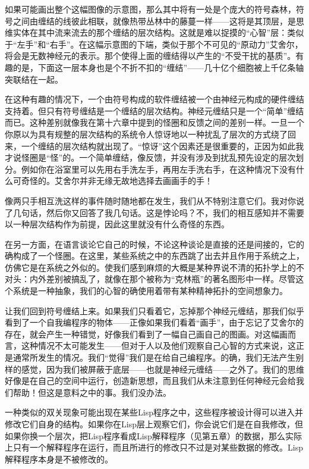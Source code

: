 如果可能画出整个这幅图像的示意图，那么其中将有一处是个庞大的符号森林，符号之间由缠结的线彼此相联，就像热带丛林中的藤蔓一样——这将是其顶层，是思维实体在其中流来流去的那个缠结的层次结构。这就是难以捉摸的“心智”层：类似于“左手”和“右手”。在这幅示意图的下端，类似于那个不可见的“原动力”艾舍尔，将会是无数神经元的表示。那个使得上面的缠结得以产生的“不受干扰的基质”。有趣的是，下面这一层本身也是个不折不扣的“缠结”——几十亿个细胞被上千亿条轴突联结在一起。

在这种有趣的情况下，一个由符号构成的软件缠结被一个由神经元构成的硬件缠结支持着。但只有符号缠结是一个缠结的层次结构。神经元缠结只是一个“简单”缠结而已。这种差别就像我在第十六章中提到的怪圈和反馈之间的差别一样。一旦一个你原以为具有规整的层次结构的系统令人惊讶地以一种扰乱了层次的方式绕了回来，一个缠结的层次结构就出现了。“惊讶”这个因素还是很重要的，正因为如此我才说怪圈是“怪”的。一个简单缠结，像反馈，并没有涉及到扰乱预先设定的层次划分。例如你在浴室里可以先用右手洗左手，再用左手洗右手，在这种情况下没有什么可奇怪的。艾舍尔并非无缘无故地选择去画画手的手！

像两只手相互洗这样的事件随时随地都在发生，我们从不特别注意它们。我对你说了几句话，然后你又回答了我几句话。这是悖论吗？不，我们的相互感知并不需要以一种层次结构作为前提，因此这里就没有什么奇怪的东西。

在另一方面，在语言谈论它自己的时候，不论这种谈论是直接的还是间接的，它的确构成了一个怪圈。在这里，某些系统之中的东西跳了出去并且作用于系统之上，仿佛它是在系统之外似的。使我们感到麻烦的大概是某种界说不清的拓扑学上的不对头：内外差别被搞乱了，就像在那个被称为“克林瓶”的著名图形中一样。尽管这个系统是一种抽象，我们的心智的确使用着带有某种精神拓扑的空间想象力。

让我们回到符号缠结上来。如果我们只看着它，忘掉那个神经元缠结，那我们似乎看到了一个自我编程序的物体——正像如果我们看着“画手”，由于忘记了艾舍尔的存在，就会产生一种错觉，好像我们看到了一幅自己画自己的图画。对这幅画而言，这种情况不太可能发生——但对于人以及他们观察自己心智的方式来说，这正是通常所发生的情况。我们“觉得”我们是在给自己编程序。的确，我们无法产生别样的感觉，因为我们被屏蔽于底层——也就是神经元缠结——之外了。我们的思维好像是在自己的空间中运行，创造新思想，而且我们从未注意到任何神经元会给我们帮助！但这是意料之中的事。我们没办法。

一种类似的双关现象可能出现在某些Lisp程序之中，这些程序被设计得可以进入并修改它们自身的结构。如果你在Lisp层上观察它们，你会说它们是在自我修改，但如果你换一个层次，把Lisp程序看成Lisp解释程序（见第五章）的数据，那么实际上只有一个解释程序在运行，而且所进行的修改只不过是对某些数据的修改。Lisp解释程序本身是不被修改的。

